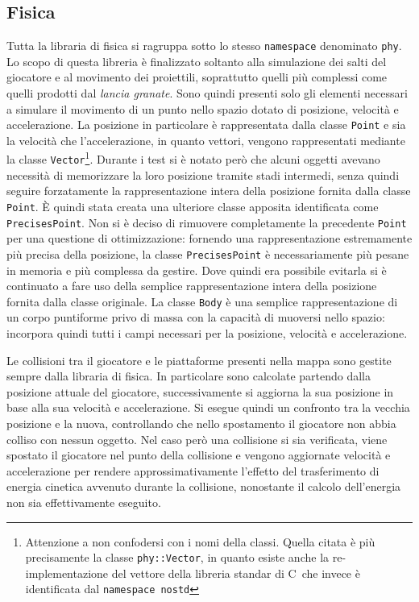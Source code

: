 \documentclass[a4paper]{article}
\def\CC{{C\nolinebreak[4]\hspace{-.05em}\raisebox{.4ex}{\tiny\bf ++}}}
\begin{document}
\subsection{Fisica}
Tutta la libraria di fisica si ragruppa sotto lo stesso \texttt{namespace} 
denominato \texttt{phy}. Lo scopo di questa libreria è finalizzato soltanto alla
simulazione dei salti del giocatore e al movimento dei proiettili, soprattutto
quelli più complessi come quelli prodotti dal \textit{lancia granate}. Sono
quindi presenti solo gli elementi necessari a simulare il movimento di un punto
nello spazio dotato di posizione, velocità e accelerazione. La posizione in 
particolare è rappresentata dalla classe \texttt{Point} e sia la velocità che 
l'accelerazione, in quanto vettori, vengono rappresentati mediante la classe
\texttt{Vector}\footnote{Attenzione a non confodersi con i nomi della classi. 
Quella citata è più precisamente la classe \texttt{phy::Vector}, in quanto 
esiste anche la re-implementazione del vettore della libreria standar di \CC\ 
che invece è identificata dal \texttt{namespace nostd}}. Durante i test si è 
notato però che alcuni oggetti avevano necessità di memorizzare la loro 
posizione tramite stadi intermedi, senza quindi seguire forzatamente la 
rappresentazione intera della posizione fornita dalla classe \texttt{Point}. È 
quindi stata creata una ulteriore classe apposita identificata come 
\texttt{PrecisesPoint}. Non si è deciso di rimuovere completamente la precedente 
\texttt{Point} per una questione di ottimizzazione: fornendo una 
rappresentazione estremamente più precisa della posizione, la classe 
\texttt{PrecisesPoint} è necessariamente più pesane in memoria e più complessa 
da gestire. Dove quindi era possibile evitarla si è continuato a fare uso della 
semplice rappresentazione intera della posizione fornita dalla classe originale.
La classe \texttt{Body} è una semplice rappresentazione di un corpo puntiforme 
privo di massa con la capacità di muoversi nello spazio: incorpora quindi tutti 
i campi necessari per la posizione, velocità e accelerazione.

Le collisioni tra il giocatore e le piattaforme presenti nella mappa sono 
gestite sempre dalla libraria di fisica. In particolare sono calcolate partendo 
dalla posizione attuale del giocatore, successivamente si aggiorna la sua 
posizione in base alla sua velocità e accelerazione. Si esegue quindi un 
confronto tra la vecchia posizione e la nuova, controllando che nello 
spostamento il giocatore non abbia colliso con nessun oggetto. Nel caso però una
collisione si sia verificata, viene spostato il giocatore nel punto della 
collisione e vengono aggiornate velocità e accelerazione per rendere 
approssimativamente l'effetto del trasferimento di energia cinetica avvenuto 
durante la collisione, nonostante il calcolo dell'energia non sia effettivamente
eseguito.
\end{document}
